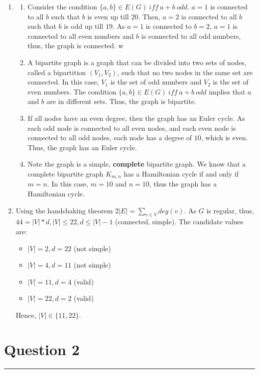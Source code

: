 \documentclass{article}
\begin{document}
\begin{enumerate}[label=(\alph*)]
    \item
          \begin{enumerate}[label=(\roman*)]
              \item  Consider the condition $\{a,b\} \in E(G)\ iff\ a+b\ odd$. $a=1$ is connected to all $b$ such that $b$ is even up till $20$. Then, $a=2$ is connected to all $b$ such that $b$ is odd up till $19$. As $a=1$ is connected to $b=2$, $a=1$ is connected to all even numbers and $b$ is connected to all odd numbers, thus, the graph is connected.
                    w              \item A bipartite graph is a graph that can be divided into two sets of nodes, called a bipartition $(V_1, V_2)$, such that no two nodes in the same set are connected. In this case, $V_1$ is the set of odd numbers and $V_2$ is the set of even numbers. The condition $\{a,b\} \in E(G)\ iff\ a+b\ odd$ implies that $a$ and $b$ are in different sets. Thus, the graph is bipartite.
              \item If all nodes have an even degree, then the graph has an Euler cycle. As each odd node is connected to all even nodes, and each even node is connected to all odd nodes, each node has a degree of $10$, which is even. Thus, the graph has an Euler cycle.
              \item Note the graph is a simple, \textbf{complete} bipartite graph. We know that a complete bipartite graph $K_{m,n}$ has a Hamiltonian cycle if and only if $m=n$. In this case, $m=10$ and $n=10$, thus the graph has a Hamiltonian cycle.
          \end{enumerate}
    \item Using the handshaking theorem $2|E|=\sum_{v\in V}deg(v)$. As $G$ is regular, thus, $44=|V|*d, |V| \leq 22, d \leq |V| - 1$ (connected, simple). The candidate values are:
          \begin{itemize}
              \item $|V|=2, d=22$ (not simple)
              \item $|V|=4, d=11$ (not simple)
              \item $|V|=11, d=4$ (valid)
              \item $|V|=22, d=2$ (valid)
          \end{itemize}
          Hence, $|V| \in \{11, 22\}$.
\end{enumerate}

\section*{Question 2}
\hrule
\vspace{0.5cm}
\end{document}
